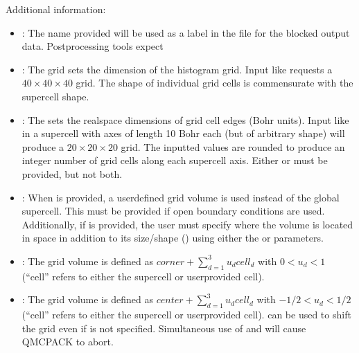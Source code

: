 \documentclass[letterpaper,10pt,english]{sphinxmanual}
\begin{document}
Additional information:
\begin{itemize}
\item {} 
: The name provided will be used as a label in the
 file for the blocked output data. Postprocessing tools
expect 

\item {} 
: The grid sets the dimension of the histogram grid. Input
like  requests a
\(40 \times 40\times 40\) grid. The shape of individual grid
cells is commensurate with the supercell shape.

\item {} 
: The  sets the real\sphinxhyphen{}space dimensions of grid cell edges
(Bohr units). Input like
 in a supercell
with axes of length 10 Bohr each (but of arbitrary shape) will
produce a \(20\times 20\times 20\) grid. The inputted 
values are rounded to produce an integer number of grid cells along
each supercell axis. Either  or  must be provided, but
not both.

\item {} 
: When  is provided, a user\sphinxhyphen{}defined grid volume is
used instead of the global supercell. This must be provided if open
boundary conditions are used. Additionally, if  is provided,
the user must specify where the volume is located in space in
addition to its size/shape () using either the  or
 parameters.

\item {} 
: The grid volume is defined as
\(corner+\sum_{d=1}^3u_dcell_d\) with \(0<u_d<1\) (“cell”
refers to either the supercell or user\sphinxhyphen{}provided cell).

\item {} 
: The grid volume is defined as
\(center+\sum_{d=1}^3u_dcell_d\) with \(-1/2<u_d<1/2\)
(“cell” refers to either the supercell or user\sphinxhyphen{}provided cell).
 can be used to shift the grid even if  is
not specified. Simultaneous use of  and  will
cause QMCPACK to abort.

\end{itemize}
\end{document}
